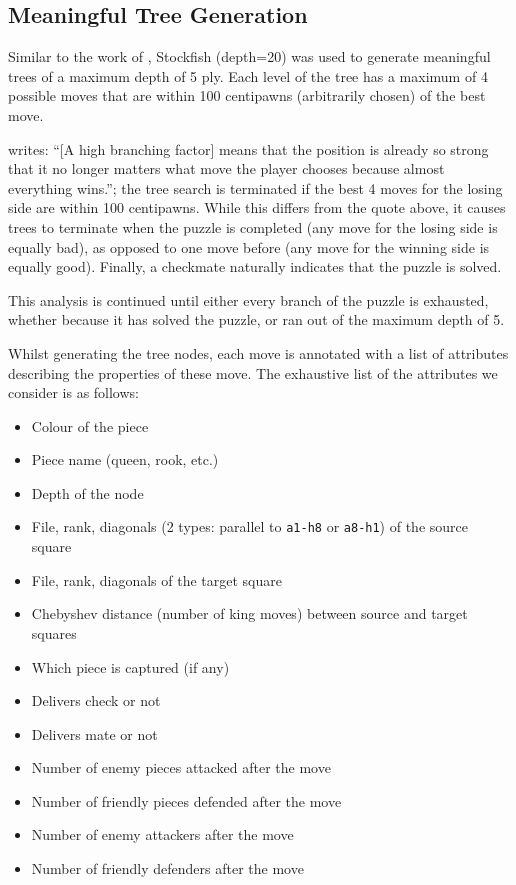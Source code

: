 \subsection{Meaningful Tree Generation}\label{treeGenSection}

Similar to the work of \citet{chessTrees}, Stockfish (depth=20) was used to
generate meaningful trees of a maximum depth of 5 ply. Each level of the tree
has a maximum of 4 possible moves that are within 100 centipawns (arbitrarily
chosen) of the best move.

\citet{chessTrees} writes: ``[A high branching factor] means that the position
is already so strong that it no longer matters what move the player chooses
because almost everything wins.''; the tree search is terminated if the best 4
moves for the losing side are within 100 centipawns. While this differs from
the quote above, it causes trees to terminate when the puzzle is completed (any
move for the losing side is equally bad), as opposed to one move before (any
move for the winning side is equally good). Finally, a checkmate naturally
indicates that the puzzle is solved. 

This analysis is continued until either every branch of the puzzle is
exhausted, whether because it has solved the puzzle, or ran out of the maximum
depth of 5.

Whilst generating the tree nodes, each move is annotated with a list of
attributes describing the properties of these move. The exhaustive list of the
attributes we consider is as follows:

\begin{itemize}
    \item Colour of the piece
    \item Piece name (queen, rook, etc.\@)
    \item Depth of the node
    \item File, rank, diagonals (2 types: parallel to \texttt{a1-h8} or
        \texttt{a8-h1}) of the source square
    \item File, rank, diagonals of the target square
    \item Chebyshev distance (number of king moves) between source and target
        squares     
    \item Which piece is captured (if any)
    \item Delivers check or not
    \item Delivers mate or not
    \item Number of enemy pieces attacked after the move
    \item Number of friendly pieces defended after the move
    \item Number of enemy attackers after the move
    \item Number of friendly defenders after the move
\end{itemize}

